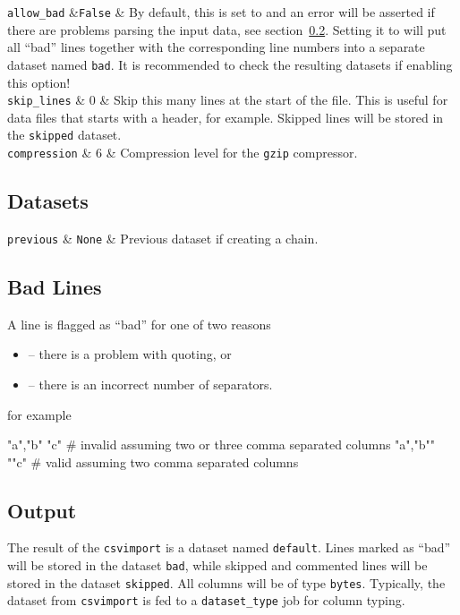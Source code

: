 \RP \texttt{allow\_bad} &\texttt{False} & By default, this is
set to \pyFalse and an error will be asserted if there are problems
parsing the input data, see section~\ref{sec:csvimport-bad}.  Setting it
to \pyTrue will put all ``bad'' lines together with the corresponding
line numbers into a separate dataset named \texttt{bad}.  It is
recommended to check the resulting datasets if enabling this
option!\\

\RP \texttt{skip\_lines} & 0 & Skip this many lines at the start of the file.
This is useful for data files that starts with a header, for
example.  Skipped lines will be stored in the \texttt{skipped} dataset.\\

\RP \texttt{compression} & 6 & Compression level for the \texttt{gzip} compressor.\\
\stoptable


\subsection{Datasets}
\starttable
  \RP \texttt{previous} & \texttt{None} & Previous dataset if creating a
  chain.\\
\stoptable


\subsection{Bad Lines}
\label{sec:csvimport-bad}
A line is flagged as ``bad'' for one of two reasons
\begin{itemize}
\item[] -- there is a problem with quoting, or
\item[] -- there is an incorrect number of separators.
\end{itemize}
for example
\begin{python}
  "a","b" "c"     # invalid assuming two or three comma separated columns
  "a","b"" ""c"   # valid assuming two comma separated columns
\end{python}


\subsection{Output}
The result of the \texttt{csvimport} is a dataset named
\texttt{default}.  Lines marked as ``bad'' will be stored in the
dataset \texttt{bad}, while skipped and commented lines will be stored
in the dataset \texttt{skipped}.  All columns will be of type
\texttt{bytes}.  Typically, the dataset from
\texttt{csvimport} is fed to a \texttt{dataset\_type} job for column
typing.


